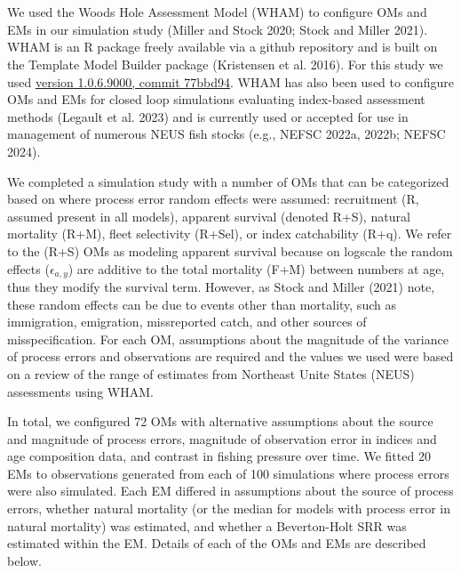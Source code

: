 \documentclass[
  12pt,
]{article}
\providecommand{\DIFadd}[1]{{\protect\color{blue}\uwave{#1}}} %
\providecommand{\DIFaddbegin}{} %
\providecommand{\DIFaddend}{} %
\providecommand{\DIFdelbegin}{} %
\providecommand{\DIFdelend}{} %
\newcommand{\DIFscaledelfig}{0.5}
\newlength{\DIFdelgraphicswidth} %
\newlength{\DIFdelgraphicsheight} %
\newcommand{\DIFaddincludegraphics}[2][]{{\color{blue}\fbox{\DIFOincludegraphics[#1]{#2}}}} %
\newcommand{\DIFdelincludegraphics}[2][]{%
\sbox{\DIFdelgraphicsbox}{\DIFOincludegraphics[#1]{#2}}%
\settoboxwidth{\DIFdelgraphicswidth}{\DIFdelgraphicsbox} %
\settoboxtotalheight{\DIFdelgraphicsheight}{\DIFdelgraphicsbox} %
\scalebox{\DIFscaledelfig}{%
\parbox[b]{\DIFdelgraphicswidth}{\usebox{\DIFdelgraphicsbox}\\[-\baselineskip] \rule{\DIFdelgraphicswidth}{0em}}\llap{\resizebox{\DIFdelgraphicswidth}{\DIFdelgraphicsheight}{%
\setlength{\unitlength}{\DIFdelgraphicswidth}%
\begin{picture}(1,1)%
\thicklines\linethickness{2pt} %
{\color[rgb]{1,0,0}\put(0,0){\framebox(1,1){}}}%
{\color[rgb]{1,0,0}\put(0,0){\line( 1,1){1}}}%
{\color[rgb]{1,0,0}\put(0,1){\line(1,-1){1}}}%
\end{picture}%
}\hspace*{3pt}}} %
} %
\DeclareRobustCommand{\DIFaddbegin}{\DIFOaddbegin \let\includegraphics\DIFaddincludegraphics} %
\DeclareRobustCommand{\DIFaddend}{\DIFOaddend \let\includegraphics\DIFOincludegraphics} %
\DeclareRobustCommand{\DIFdelbegin}{\DIFOdelbegin \let\includegraphics\DIFdelincludegraphics} %
\DeclareRobustCommand{\DIFdelend}{\DIFOaddend \let\includegraphics\DIFOincludegraphics} %
\begin{document}
\DIFdelbegin %
\DIFdelend \DIFaddbegin \section*{\DIFadd{Methods}}\label{methods}
\DIFaddend {}

We used the Woods Hole Assessment Model (WHAM) to configure OMs and EMs
in our simulation study (Miller and Stock 2020; Stock and Miller 2021).
WHAM is an R package freely available via a github repository and is
built on the Template Model Builder package (Kristensen et al. 2016).
For this study we used
\href{https://github.com/timjmiller/wham/tree/77bbd946e4881216a439933473d1c58b21c270c3}{version
1.0.6.9000, commit 77bbd94}. WHAM has also been used to configure OMs
and EMs for closed loop simulations evaluating index-based assessment
methods (Legault et al. 2023) and is currently used or accepted for use
in management of numerous NEUS fish stocks (e.g., NEFSC 2022a, 2022b;
NEFSC 2024).

We completed a simulation study with a number of OMs that can be
categorized based on where process error random effects were assumed:
recruitment (R, assumed present in all models), apparent survival
(denoted R+S), natural mortality (R+M), fleet selectivity (R+Sel), or
index catchability (R+q). We refer to the (R+S) OMs as modeling apparent
survival because on logscale the random effects (\(\epsilon_{a,y}\)) are
additive to the total mortality (F+M) between numbers at age, thus they
modify the survival term. However, as Stock and Miller (2021) note,
these random effects can be due to events other than mortality, such as
immigration, emigration, missreported catch, and other sources of
misspecification. For each OM, assumptions about the magnitude of the
variance of process errors and observations are required and the values
we used were based on a review of the range of estimates from Northeast
Unite States (NEUS) assessments using WHAM.

In total, we configured 72 OMs with alternative assumptions about the
source and magnitude of process errors, magnitude of observation error
in indices and age composition data, and contrast in fishing pressure
over time. We fitted 20 EMs to observations generated from each of 100
simulations where process errors were also simulated. Each EM differed
in assumptions about the source of process errors, whether natural
mortality (or the median for models with process error in natural
mortality) was estimated, and whether a Beverton-Holt SRR was estimated
within the EM. Details of each of the OMs and EMs are described below.
\end{document}
